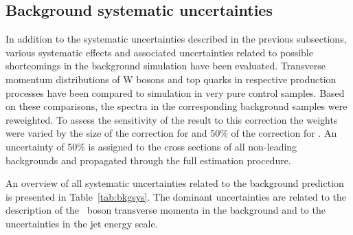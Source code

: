 \subsection{Background systematic uncertainties}\label{sec:singleleptonSyst}

In addition to the systematic uncertainties described in the previous subsections, various systematic effects and associated uncertainties related to possible shortcomings in the background simulation have been evaluated. Transverse momentum distributions of W bosons and top quarks in respective production processes have been compared to simulation in very pure control samples. Based on these comparisons, the \pt spectra in the corresponding background samples were reweighted.
To assess the sensitivity of the result to this correction the weights were varied by the size of the correction for \Wjets and 50\% of the correction for \ttbar. 
An uncertainty of 50\% is assigned to the cross sections of all non-leading backgrounds and propagated through the full estimation procedure.


An overview of all systematic uncertainties related to the background prediction is presented in Table~\ref{tab:bkgsys}. 
The dominant uncertainties are related to the description of the \PW\ boson transverse momenta in the \Wjets background and to the uncertainties in the jet energy scale.

